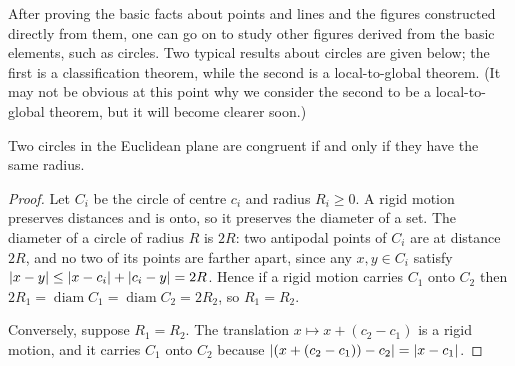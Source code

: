 After proving the basic facts about points and lines and the figures constructed directly from them, one can go on to study other figures derived from the basic elements, such as circles. Two typical results about circles are given below; the first is a classification theorem, while the second is a local-to-global theorem. (It may not be obvious at this point why we consider the second to be a local-to-global theorem, but it will become clearer soon.)

\begin{theorem}
\label{thm:circle-classification}
\leanok
Two circles in the Euclidean plane are congruent if and only if they have the same radius.
\end{theorem}
\begin{proof}
Let $C_i$ be the circle of centre $c_i$ and radius $R_i\ge 0$. A rigid motion preserves distances and
is onto, so it preserves the diameter of a set. The diameter of a circle of radius $R$ is $2R$: two
antipodal points of $C_i$ are at distance $2R$, and no two of its points are farther apart, since any
$x,y\in C_i$ satisfy $\lvert x-y \rvert \le \lvert x-c_i \rvert + \lvert c_i-y \rvert = 2R$. Hence if a rigid motion
carries $C_1$ onto $C_2$ then $2R_1 = \operatorname{diam} C_1 = \operatorname{diam} C_2 = 2R_2$, so
$R_1 = R_2$.

Conversely, suppose $R_1 = R_2$. The translation $x\mapsto x + (c_2-c_1)$ is a rigid motion, and it
carries $C_1$ onto $C_2$ because $\lvert (x + (c_2-c_1)) - c_2 \rvert = \lvert x-c_1 \rvert$.
\end{proof}

